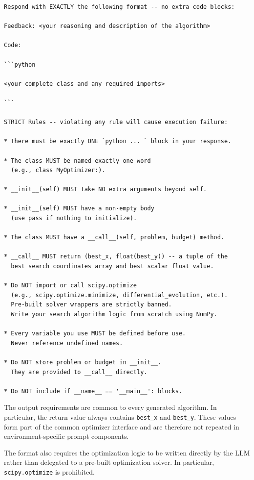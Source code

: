 \begin{verbatim}
Respond with EXACTLY the following format -- no extra code blocks:

Feedback: <your reasoning and description of the algorithm>

Code:

```python

<your complete class and any required imports>

```

STRICT Rules -- violating any rule will cause execution failure:

* There must be exactly ONE `python ... ` block in your response.

* The class MUST be named exactly one word
  (e.g., class MyOptimizer:).

* __init__(self) MUST take NO extra arguments beyond self.

* __init__(self) MUST have a non-empty body
  (use pass if nothing to initialize).

* The class MUST have a __call__(self, problem, budget) method.

* __call__ MUST return (best_x, float(best_y)) -- a tuple of the
  best search coordinates array and best scalar float value.

* Do NOT import or call scipy.optimize
  (e.g., scipy.optimize.minimize, differential_evolution, etc.).
  Pre-built solver wrappers are strictly banned.
  Write your search algorithm logic from scratch using NumPy.

* Every variable you use MUST be defined before use.
  Never reference undefined names.

* Do NOT store problem or budget in __init__.
  They are provided to __call__ directly.

* Do NOT include if __name__ == '__main__': blocks.
\end{verbatim}

The output requirements are common to every generated algorithm. In
particular, the return value always contains \texttt{best\_x} and
\texttt{best\_y}. These values form part of the common optimizer interface
and are therefore not repeated in environment-specific prompt components.

The format also requires the optimization logic to be written directly by the
LLM rather than delegated to a pre-built optimization solver. In particular,
\texttt{scipy.optimize} is prohibited.


